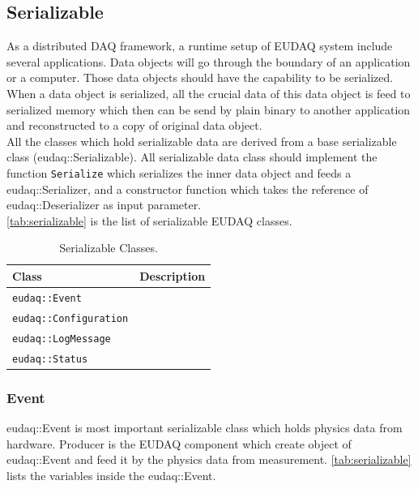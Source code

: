 \subsection{Serializable}
As a distributed DAQ framework, a runtime setup of EUDAQ system include several applications. Data objects will go through the boundary of an application or a computer. Those data objects should have the capability to be serialized. When a data object is serialized, all the crucial data of this data object is feed to serialized memory which then can be send by plain binary to another application and reconstructed to a copy of original data object. \\

All the classes which hold serializable data are derived from a base serializable class (eudaq::Serializable). All serializable data class
should implement the function \texttt{Serialize} which serializes the inner data object and feeds a eudaq::Serializer, and a constructor function which takes the reference of eudaq::Deserializer as input parameter.\\

\autoref{tab:serializable} is the list of serializable EUDAQ classes.

\begin{table}
\centering
\small
\begin{tabular}{ l | l }
  \textbf{Class} & \textbf{Description}\\
  \hline
  \texttt{eudaq::Event} & \\
  \texttt{eudaq::Configuration} & \\
  \texttt{eudaq::LogMessage} & \\
  \texttt{eudaq::Status} &  \\
\end{tabular}
\caption{Serializable Classes.}
\label{tab:serializable}
\end{table}

\subsubsection{Event}
eudaq::Event is most important serializable class which holds physics data from hardware. Producer is the EUDAQ component which create object of eudaq::Event and feed it by the physics data from measurement.  \autoref{tab:serializable} lists the variables inside the eudaq::Event. \\

